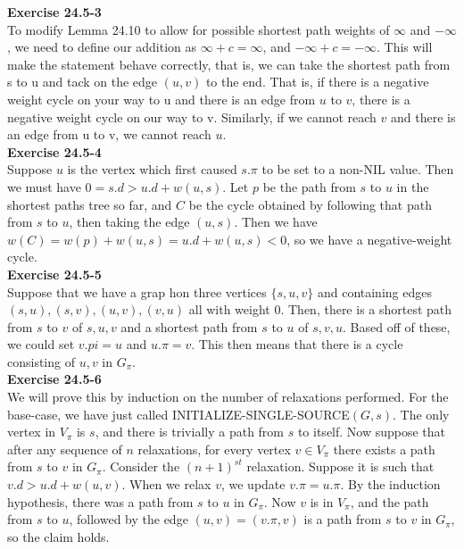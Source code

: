 \documentclass{article}
\begin{document}
\noindent\textbf{Exercise 24.5-3}\\

To modify Lemma 24.10 to allow for possible shortest path weights of $\infty$ and $-\infty$, we need to define our addition as $\infty + c = \infty$, and $-\infty + c = -\infty$. This will make the statement behave correctly, that is, we can take the shortest path from s to u and tack on the edge $(u,v)$ to the end. That is, if there is a negative weight cycle on your way to u and there is an edge from $u$ to $v$, there is a negative weight cycle on our way to v. Similarly, if we cannot reach $v$ and there is an edge from u to v, we cannot reach $u$.\\

\noindent\textbf{Exercise 24.5-4}\\

Suppose $u$ is the vertex which first caused $s.\pi$ to be set to a non-NIL value.  Then we must have $0 = s.d > u.d + w(u,s)$. Let $p$ be the path from $s$ to $u$ in the shortest paths tree so far, and $C$ be the cycle obtained by following that path from $s$ to $u$, then taking the edge $(u,s)$.  Then we have $w(C) = w(p) + w(u,s) = u.d + w(u,s) < 0$, so we have a negative-weight cycle. \\


\noindent\textbf{Exercise 24.5-5}\\

Suppose that we have a grap hon three vertices $\{s,u,v\}$ and containing edges $(s,u),(s,v),(u,v),(v,u)$ all with weight 0. Then, there is a shortest path from $s$ to $v$ of $s,u,v$ and a shortest path from $s$ to $u$ of $s,v,u$. Based off of these, we could set $v.pi= u$ and $u.\pi = v$. This then means that there is a cycle consisting of $u,v$ in $G_\pi$.\\

\noindent\textbf{Exercise 24.5-6}\\

We will prove this by induction on the number of relaxations performed.  For the base-case, we have just called INITIALIZE-SINGLE-SOURCE$(G,s)$.  The only vertex in $V_\pi$ is $s$, and there is trivially a path from $s$ to itself.  Now suppose that after any sequence of $n$ relaxations, for every vertex $v \in V_\pi$ there exists a path from $s$ to $v$ in $G_\pi$.  Consider the $(n+1)^{st}$ relaxation.  Suppose it is such that $v.d > u.d + w(u,v)$.  When we relax $v$, we update $v.\pi = u.\pi$.  By the induction hypothesis, there was a path from $s$ to $u$ in $G_\pi$.  Now $v$ is in $V_\pi$, and the path from $s$ to $u$, followed by the edge $(u,v) = (v.\pi, v)$ is a path from $s$ to $v$ in $G_\pi$, so the claim holds. \\
\end{document}
